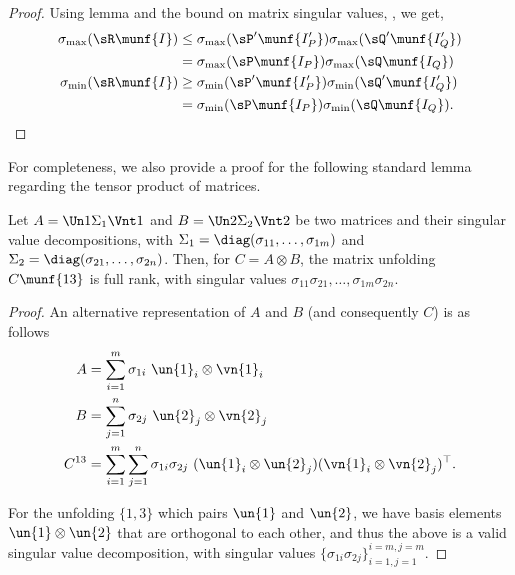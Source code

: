 \begin{proof}
Using lemma  and the bound on matrix singular
values, , we get,
\begin{align*}
\sigma_{\max}(\sR\munf{I}) 
    &\le \sigma_{\max}({\sP'}\munf{I'_P}) \sigma_{\max}({\sQ'}\munf{I'_Q}) \\
      &= \sigma_{\max}(\sP\munf{I_P}) \sigma_{\max}(\sQ\munf{I_Q}) \\
    \sigma_{\min}(\sR\munf{I})  
    &\ge \sigma_{\min}({\sP'}\munf{I'_P}) \sigma_{\min}({\sQ'}\munf{I'_Q}) \\
      &= \sigma_{\min}(\sP\munf{I_P}) \sigma_{\min}(\sQ\munf{I_Q}).
\end{align*}
\end{proof}

For completeness, we also provide a proof for the following standard
lemma regarding the tensor product of matrices.

\begin{lemma}
  \label{lem:tensor-prod}
  Let $A = \Un1 \Sigma_1 \Vnt1$ and $B = \Un2 \Sigma_2 \Vnt2$ be two
  matrices and their singular value decompositions, 
  with $\Sigma_1 = \diag(\sigma_{11}, \ldots, \sigma_{1m})$ and $\Sigma_2
  = \diag(\sigma_{21}, \ldots, \sigma_{2n})$. 
  Then, for $C = A \otimes B$, the matrix unfolding $C\munf{13}$ is full
  rank, with singular values $\sigma_{11} \sigma_{21}, \ldots, \sigma_{1m}
  \sigma_{2n}$.
\end{lemma}
\begin{proof}
  An alternative representation of $A$ and $B$ (and consequently $C$) is as follows
  \begin{align*}
    A &= \sum_{i=1}^m \sigma_{1i}~ \un{1}_i \otimes \vn{1}_i \\
    B &= \sum_{j=1}^n \sigma_{2j}~ \un{2}_j \otimes \vn{2}_j \\
    C^{13} &= \sum_{i=1}^m \sum_{j=1}^n \sigma_{1i} \sigma_{2j}~ (\un{1}_i \otimes \un{2}_j)(\vn{1}_i \otimes \vn{2}_j)^\top.
  \end{align*}

  For the unfolding $\{1,3\}$ which pairs $\un{1}$ and $\un{2}$, we have
basis elements $\un{1} \otimes \un{2}$ that are orthogonal to each
other, and thus the above is a valid singular value decomposition,
with singular values $\{ \sigma_{1i} \sigma_{2j} \}_{i=1,j=1}^{i=m,j=m}$. 
\end{proof}

